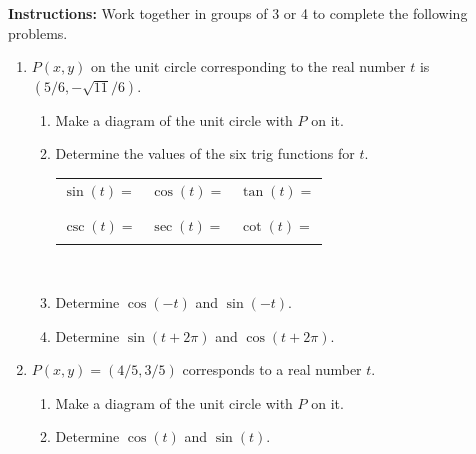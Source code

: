 




\noindent \textbf{Instructions:}  Work together in groups of  3 or 4 to complete the following problems.\\


\begin{enumerate}


\item $P(x,y)$ on the unit circle corresponding to the real number $t$ is $(5/6,-\sqrt{11}/6)$. 

\begin{enumerate}
\item Make a diagram of the unit circle with $P$ on it. \vfill

\item Determine the values of the six trig functions for $t$. 

\begin{tabular}{l l l }
$\sin(t)=$\phantom{sldkfjdlkdlkjfl}&  $\cos(t)=$\phantom{sldkfjdlkdlkjfl}& $\tan(t)=$\phantom{sldkfjdlkdlkjfl}    \\
& & \\
& & \\
$\csc(t)=$ &  $\sec(t)=$   & $\cot(t)=$    \\
& & \\

\end{tabular}\\


\item Determine $\cos(-t)$ and $\sin(-t)$. \\[1in]

\item Determine $\sin(t+2\pi)$ and $\cos(t+2\pi)$. \\[1in]

\end{enumerate}

\newpage

\item $P(x,y) = (4/5, 3/5)$ corresponds to a real number $t$. 
\begin{enumerate}
\item Make a diagram of the unit circle with $P$ on it. \\[1in]

\item Determine $\cos(t)$ and $\sin(t)$. \\[.5in]


\end{enumerate}
\end{enumerate}
